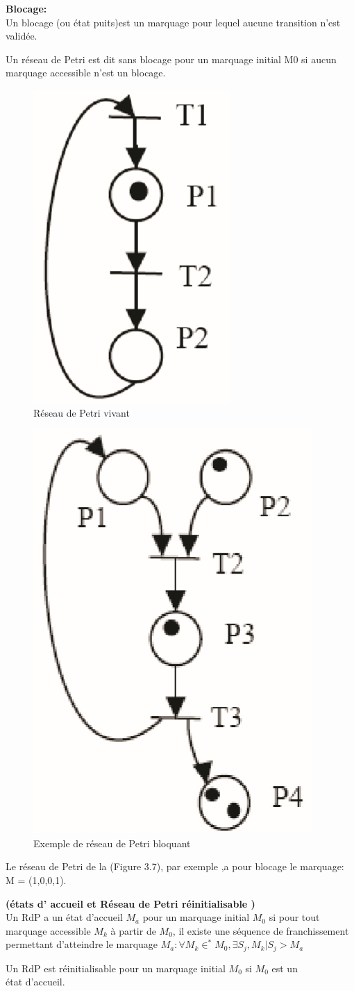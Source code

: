 \begin{defn}\textbf{Blocage:}\\
	Un blocage (ou état puits)est un marquage pour lequel aucune transition n'est validée.
\end{defn}


Un réseau de Petri est dit sans blocage pour un marquage initial M0 si aucun marquage accessible n'est un blocage.
\begin{figure}[h]
	\centering
	\includegraphics[width=0.2\linewidth]{images/Petrivivant}
	\caption{Réseau de Petri vivant}
	\label{fig:petrivivant}
\end{figure}
\begin{figure}[h]
	\centering
	\includegraphics[width=0.25\linewidth]{images/Petribloquant}
	\caption{Exemple de réseau de Petri bloquant}
	\label{fig:petribloquant}
\end{figure}

Le réseau de Petri de la (Figure 3.7), par exemple ,a pour blocage le marquage: 
M = (1,0,0,1).

\begin{defn} \textbf{(états d' accueil et Réseau de Petri réinitialisable ) }\\
Un RdP a un état d’accueil $ M_{a} $ pour un marquage initial $ M_{0} $ si pour tout marquage accessible $ M_{k} $ à partir de $ M_{0} $, il existe une séquence de franchissement permettant d'atteindre le marquage
 $M_{a}: \forall M_{k} \in^{*} M_{0},   \exists S_{j},M_{k}|S_{j}>M_{a}$
\end{defn}
Un RdP est réinitialisable pour un marquage initial $ M_{0} $ si $ M_{0} $ est un\\
 état d'accueil.
\\

